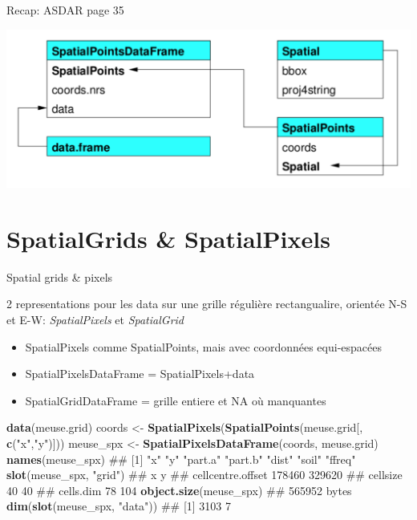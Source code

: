 \documentclass[8pt,ignorenonframetext,]{beamer}
\newenvironment{Shaded}{\begin{snugshade}}{\end{snugshade}}
\newcommand{\KeywordTok}[1]{\textcolor[rgb]{0.13,0.29,0.53}{\textbf{{#1}}}}
\newcommand{\StringTok}[1]{\textcolor[rgb]{0.31,0.60,0.02}{{#1}}}
\newcommand{\NormalTok}[1]{{#1}}
\begin{document}
\begin{frame}{Recap: ASDAR page 35}

\begin{center}
  \includegraphics[width=1\textwidth]{figSpatialPoints.png}
\end{center}

\end{frame}

\section{SpatialGrids \&
SpatialPixels}\label{spatialgrids-spatialpixels}

\begin{frame}[fragile]{Spatial grids \& pixels}

2 representations pour les data sur une grille régulière rectangualire,
orientée N-S et E-W: \emph{SpatialPixels} et \emph{SpatialGrid}

\begin{itemize}
\item
  SpatialPixels comme SpatialPoints, mais avec coordonnées equi-espacées
\item
  SpatialPixelsDataFrame = SpatialPixels+data
\item
  SpatialGridDataFrame = grille entiere et NA où manquantes
\end{itemize}

\begin{Shaded}
\begin{Highlighting}[]
 \KeywordTok{data}\NormalTok{(meuse.grid)}
 \NormalTok{coords <-}\StringTok{ }\KeywordTok{SpatialPixels}\NormalTok{(}\KeywordTok{SpatialPoints}\NormalTok{(meuse.grid[, }\KeywordTok{c}\NormalTok{(}\StringTok{"x"}\NormalTok{,}\StringTok{"y"}\NormalTok{)]))}
\NormalTok{meuse_spx <-}\StringTok{ }\KeywordTok{SpatialPixelsDataFrame}\NormalTok{(coords, meuse.grid)}
\KeywordTok{names}\NormalTok{(meuse_spx)}
\NormalTok{## [1] "x"      "y"      "part.a" "part.b" "dist"   "soil"   "ffreq"}
\KeywordTok{slot}\NormalTok{(meuse_spx, }\StringTok{"grid"}\NormalTok{)}
\NormalTok{##                        x      y}
\NormalTok{## cellcentre.offset 178460 329620}
\NormalTok{## cellsize              40     40}
\NormalTok{## cells.dim             78    104}
\KeywordTok{object.size}\NormalTok{(meuse_spx) }
\NormalTok{## 565952 bytes}
\KeywordTok{dim}\NormalTok{(}\KeywordTok{slot}\NormalTok{(meuse_spx, }\StringTok{"data"}\NormalTok{))}
\NormalTok{## [1] 3103    7}
\end{Highlighting}
\end{Shaded}

\end{frame}
\end{document}
